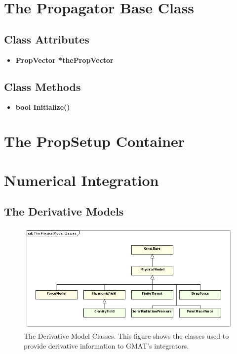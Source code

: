 \section{The Propagator Base Class}

\subsection{Class Attributes}

\begin{itemize}
\item \textbf{PropVector *thePropVector}
\end{itemize}

\subsection{Class Methods}

\begin{itemize}
\item \textbf{bool Initialize()}
\end{itemize}


\section{\label{section:PropSetup}The PropSetup Container}

\section{Numerical Integration}


\subsection{\label{section:TheODEModel} The Derivative Models}

\begin{figure}[htb]
\begin{center}
\includegraphics[350,170]{Images/ThePhysicalModelClasses.png}
\caption[The Derivative Model Classes]{\label{figure:PhysicalModelClasses}The Derivative Model
Classes.  This figure shows the classes used to provide derivative information to GMAT's
integrators.}
\end{center}
\end{figure}

